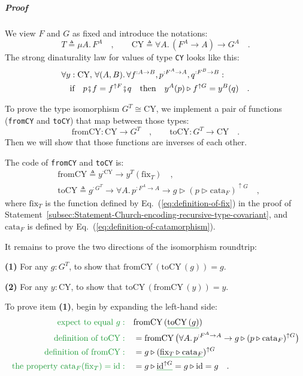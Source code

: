 \subparagraph{Proof}

We view $F$ and $G$ as fixed and introduce the notations:
\[
T\triangleq\mu A.\,F^{A}\quad,\quad\quad\text{CY}\triangleq\forall A.\,(F^{A}\rightarrow A)\rightarrow G^{A}\quad.
\]
The strong dinaturality law for values of type \lstinline!CY! looks
like this:
\begin{align*}
 & \forall y:\text{CY},\,\forall(A,B).\,\forall f^{:A\rightarrow B},p^{:F^{A}\rightarrow A},q^{:F^{B}\rightarrow B}:\\
 & \quad\text{if}\quad p\bef f=f^{\uparrow F}\bef q\quad\text{then}\quad y^{A}(p)\triangleright f^{\uparrow G}=y^{B}(q)\quad.
\end{align*}

To prove the type isomorphism $G^{T}\cong\text{CY}$, we implement
a pair of functions (\lstinline!fromCY! and \lstinline!toCY!) that
map between those types:
\[
\text{fromCY}:\text{CY}\rightarrow G^{T}\quad,\quad\quad\text{toCY}:G^{T}\rightarrow\text{CY}\quad.
\]
Then we will show that those functions are inverses of each other.

The code of \lstinline!fromCY! and \lstinline!toCY! is:
\begin{align*}
 & \text{fromCY}\triangleq y^{:\text{CY}}\rightarrow y^{T}(\text{fix}_{T})\quad,\\
 & \text{toCY}\triangleq g^{:G^{T}}\rightarrow\forall A.\,p^{:F^{A}\rightarrow A}\rightarrow g\triangleright(p\triangleright\text{cata}_{F})^{\uparrow G}\quad,
\end{align*}
where $\text{fix}_{T}$ is the function defined by Eq.~(\ref{eq:definition-of-fix})
in the proof of Statement~\ref{subsec:Statement-Church-encoding-recursive-type-covariant},
and $\text{cata}_{F}$ is defined by Eq.~(\ref{eq:definition-of-catamorphism}).

It remains to prove the two directions of the isomorphism roundtrip:

\textbf{(1)} For any $g:G^{T}$, to show that $\text{fromCY}\,(\text{toCY}\,(g))=g$.

\textbf{(2)} For any $y:\text{CY}$, to show that $\text{toCY}\,(\text{fromCY}\,(y))=y$.

To prove item \textbf{(1)}, begin by expanding the left-hand side:
\begin{align*}
{\color{greenunder}\text{expect to equal }g:}\quad & \text{fromCY}\,(\gunderline{\text{toCY}\,(g)})\\
{\color{greenunder}\text{definition of }\text{toCY}:}\quad & =\text{fromCY}\,\big(\forall A.\,p^{:F^{A}\rightarrow A}\rightarrow g\triangleright(p\triangleright\text{cata}_{F})^{\uparrow G}\big)\\
{\color{greenunder}\text{definition of }\text{fromCY}:}\quad & =g\triangleright(\gunderline{\text{fix}_{T}\triangleright\text{cata}_{F}})^{\uparrow G}\\
{\color{greenunder}\text{the property }\text{cata}_{F}(\text{fix}_{T})=\text{id}:}\quad & =g\triangleright\gunderline{\text{id}^{\uparrow G}}=g\triangleright\text{id}=g\quad.
\end{align*}

